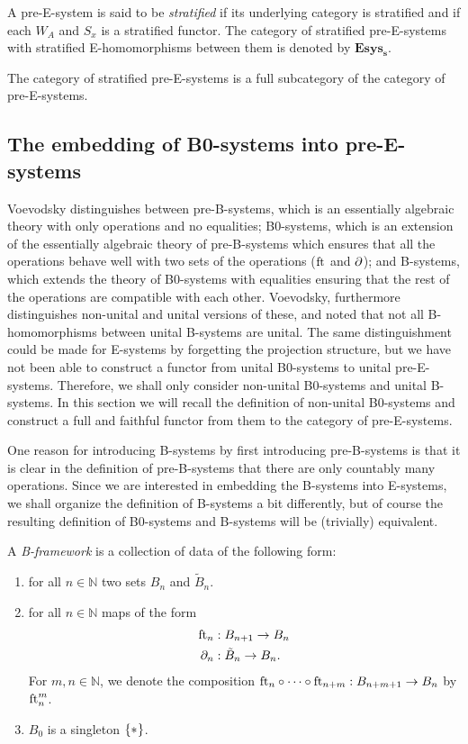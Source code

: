 \begin{defn}
A pre-E-system is said to be \emph{stratified} if its underlying category is
stratified and if each $W_A$ and $S_x$ is a stratified functor. The category of
stratified pre-E-systems with stratified E-homomorphisms between them is denoted by
$\mathbf{Esys_s}$.
\end{defn}

\begin{cor}\label{lem:strat_full}
The category of stratified pre-E-systems is a full subcategory of the category of
pre-E-systems.
\end{cor}

\subsection{The embedding of B0-systems into pre-E-systems}

Voevodsky distinguishes between pre-B-systems, which is an essentially algebraic theory with
only operations and no equalities; B0-systems, which is an extension of the
essentially algebraic theory of pre-B-systems which ensures that all the operations behave
well with two sets of the operations ($\eft$ and $\ebd$); and B-systems, which extends the 
theory of B0-systems with equalities ensuring that the rest of the operations 
are compatible with each other. Voevodsky, furthermore distinguishes
non-unital and unital versions of these, and noted that not all B-homomorphisms
between unital B-systems are unital. The same distinguishment could be made for 
E-systems by forgetting the projection structure, but we have not been able to construct a
functor from unital B0-systems to unital pre-E-systems. Therefore, we shall only
consider non-unital B0-systems and unital B-systems. In this section we will
recall the definition of non-unital B0-systems and construct a full and faithful
functor from them to the category of pre-E-systems. 

One reason for introducing B-systems by first introducing pre-B-systems is that
it is clear in the definition of pre-B-systems that there are only countably
many operations. Since we are interested in embedding the B-systems into E-systems,
we shall organize the definition of B-systems a bit differently, but of course
the resulting definition of B0-systems and B-systems will be (trivially) 
equivalent.

\begin{defn}
A \emph{B-framework} is a collection of data of the following form:
\begin{enumerate}
\item for all $n\in\mathbb{N}$ two sets $B_n$ and $\tilde{B}_n$. 
\item for all $n\in\mathbb{N}$ maps of the form
\begin{align*}
\eft[n] & : B_{n+1}\to B_n \\
\ebd[n] & : \tilde{B}_n\to B_n.
\end{align*}
For $m,n\in\mathbb{N}$, we denote the composition $\eft[n]\circ\cdots\circ\eft[n+m]:B_{n+m+1}\to B_n$ by $\eft[n]^m$. 
\item $B_0$ is a singleton $\{\pt\}$.
\end{enumerate} 
\end{defn}

